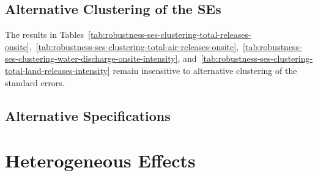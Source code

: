 \documentclass[12pt, english]{article}
\begin{document}
    \subsection{Alternative Clustering of the SEs}\label{subsec:alternative-clustering-of-the-ses}
    The results in Tables~\ref{tab:robustness-ses-clustering-total-releases-onsite},~\ref{tab:robustness-ses-clustering-total-air-releases-onsite},~\ref{tab:robustness-ses-clustering-water-discharge-onsite-intensity}, and~\ref{tab:robustness-ses-clustering-total-land-releases-intensity} remain insensitive to alternative clustering of the standard errors.
    
    
    
    


    \subsection{Alternative Specifications}\label{subsec:alternative-specifications}


    \section{Heterogeneous Effects}\label{sec:heterogeneous-effects}
\end{document}

